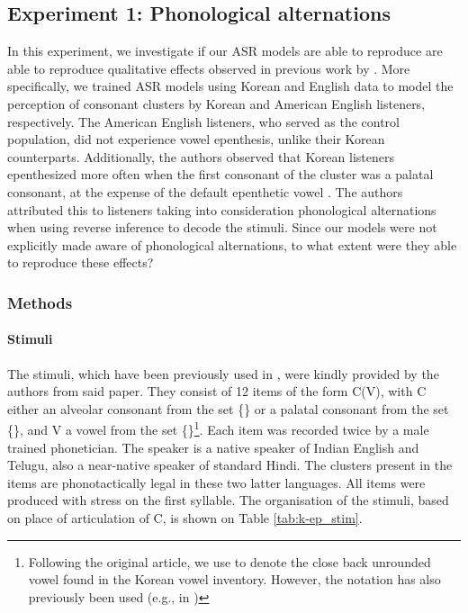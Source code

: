 {\subsection{{\color{red}Experiment 1: Phonological alternations}}
In this experiment, we investigate if our ASR models are able to reproduce are able to reproduce qualitative effects observed in previous work by \cite{durvasula2015}. More specifically, we trained ASR models using Korean and English data to model the perception of consonant clusters by Korean and American English listeners, respectively. The American English listeners, who served as the control population, did not experience vowel epenthesis, unlike their Korean counterparts. Additionally, the authors observed that Korean listeners epenthesized  more often when the first consonant of the cluster was a palatal consonant, at the expense of the default epenthetic vowel . The authors attributed this to listeners taking into consideration phonological alternations when using reverse inference to decode the stimuli. Since our models were not explicitly made aware of phonological alternations, to what extent were they able to reproduce these effects?  

\subsubsection{Methods}
\paragraph{Stimuli}

The stimuli, which have been previously used in \cite{durvasula2015}, were kindly provided by the authors from said paper. They consist of 12 items of the form C(V), with \textsc{C} either an alveolar consonant from the set \{\} or a palatal consonant from the set \{\}, and \textsc{V} a vowel from the set \{\}\footnote{Following the original article, we use \textipa{[1]} to denote the close back unrounded vowel found in the Korean vowel inventory. However, the notation \textipa{[W]} has also previously been used (e.g., in \cite{kabak2007})}.
Each item was recorded twice by a male trained phonetician. The speaker is a native speaker of Indian English and Telugu, also a near-native speaker of standard Hindi. The clusters present in the items are phonotactically legal in these two latter languages. All items were produced with stress on the first syllable.
The organisation of the stimuli, based on place of articulation of \textsc{C}, is shown on Table \ref{tab:k-ep_stim}.

}
